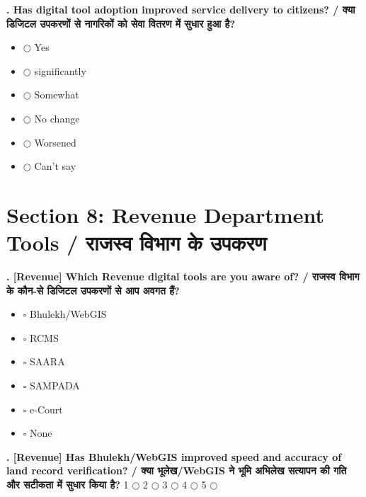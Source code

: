 \documentclass[11pt,a4paper]{article}
\newcounter{qcounter}
\begin{document}
\textbf{. Has digital tool adoption improved service delivery to citizens? / क्या डिजिटल उपकरणों से नागरिकों को सेवा वितरण में सुधार हुआ है?}
\vspace{0.1cm}
\begin{itemize}[label=, itemsep=0.1cm, leftmargin=0.5cm]
    \item $\bigcirc$ Yes
    \item $\bigcirc$ significantly
    \item $\bigcirc$ Somewhat
    \item $\bigcirc$ No change
    \item $\bigcirc$ Worsened
    \item $\bigcirc$ Can't say
\end{itemize}
\vspace{0.2cm}


\section*{Section 8: Revenue Department Tools / राजस्व विभाग के उपकरण}
\vspace{0.2cm}
\textbf{. [Revenue] Which Revenue digital tools are you aware of? / राजस्व विभाग के कौन-से डिजिटल उपकरणों से आप अवगत हैं?}
\vspace{0.1cm}
\begin{itemize}[label=, itemsep=0.1cm, leftmargin=0.5cm]
    \item $\square$ Bhulekh/WebGIS
    \item $\square$ RCMS
    \item $\square$ SAARA
    \item $\square$ SAMPADA
    \item $\square$ e-Court
    \item $\square$ None
\end{itemize}
\vspace{0.2cm}

\textbf{. [Revenue] Has Bhulekh/WebGIS improved speed and accuracy of land record verification? / क्या भूलेख/WebGIS ने भूमि अभिलेख सत्यापन की गति और सटीकता में सुधार किया है?}
\vspace{0.1cm}
\vspace{0.1cm}
1 $\bigcirc$ \hspace{1cm} 2 $\bigcirc$ \hspace{1cm} 3 $\bigcirc$ \hspace{1cm} 4 $\bigcirc$ \hspace{1cm} 5 $\bigcirc$
\vspace{0.4cm}
\end{document}
